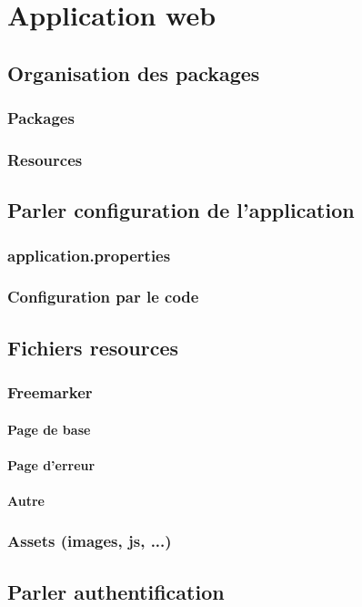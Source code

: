 \chapter{Application web}
	\section{Organisation des packages}
		\subsection{Packages}
		\subsection{Resources}
	\section{Parler configuration de l'application}
		\subsection{application.properties}
		\subsection{Configuration par le code}
	\section{Fichiers resources}
		\subsection{Freemarker}
			\subsubsection{Page de base}
			\subsubsection{Page d'erreur}
			\subsubsection{Autre}
		\subsection{Assets (images, js, ...)}
	\section{Parler authentification}
